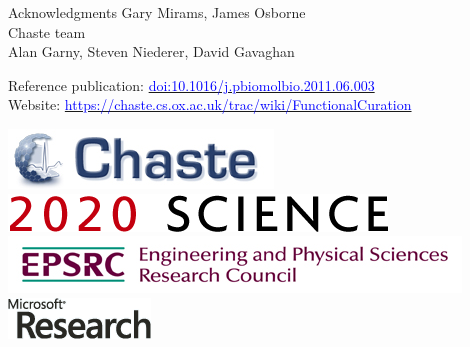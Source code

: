 \documentclass[t,xcolor={usenames,dvipsnames}]{beamer}
\newcommand{\myhref}[2]{\href{#1}{\textcolor{Blue}{#2}}}
\newcommand{\myurl}[1]{\myhref{#1}{#1}}
\newcommand{\doi}[1]{\myhref{http://dx.doi.org/#1}{doi:#1}}
\begin{document}
\begin{frame}{Acknowledgments}
Gary Mirams, James Osborne\\
Chaste team\\
Alan Garny, Steven Niederer, David Gavaghan

Reference publication: \doi{10.1016/j.pbiomolbio.2011.06.003}\\
Website: \myurl{https://chaste.cs.ox.ac.uk/trac/wiki/FunctionalCuration}

\begin{center}
\includegraphics[scale=.9]{chaste-266x60}\\ \vspace{.3cm}
\includegraphics[scale=.7]{logo2020science}\\ \vspace{.4cm}
\includegraphics[width=.55\textwidth]{EPSRC1RGBLO} \hspace{.1cm}
\includegraphics[scale=.55]{logo_msr}
\end{center}
\end{frame}
\end{document}
